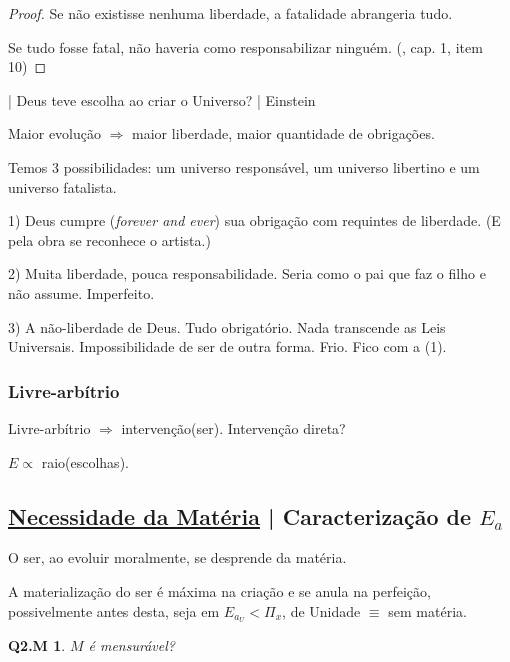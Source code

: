 \documentclass[12pt,a4paper]{article}
\begin{document}
			\begin{proof}
				Se n\~ao existisse nenhuma liberdade, a fatalidade abrangeria tudo.

				Se tudo fosse fatal, n\~ao haveria como responsabilizar ningu\'em.	(\cite{ceuinf}, cap. 1, item 10)
			\end{proof}

| Deus teve escolha ao criar o Universo? | Einstein

Maior evolu\c{c}\~ao $\Rightarrow$ maior liberdade, maior quantidade de obriga\c{c}\~oes.

Temos 3 possibilidades: um universo respons\'avel, um universo libertino e um universo fatalista.

1) Deus cumpre (\emph{forever and ever}) sua obriga\c{c}\~ao com requintes de liberdade. (E pela obra se reconhece o artista.)

2) Muita liberdade, pouca responsabilidade. Seria como o pai que faz o filho e n\~ao assume. Imperfeito.

3) A n\~ao-liberdade de Deus. Tudo obrigat\'orio. Nada transcende as Leis Universais. Impossibilidade de ser de outra forma.
Frio. Fico com a (1).

		\subsubsection{Livre-arb\'itrio}
			\begin{flushright}
			\end{flushright}

			Livre-arb\'itrio $\Rightarrow$ interven\c{c}\~ao(ser). Interven\c{c}\~ao direta?

			$E \propto$ raio(escolhas).

		\subsection{\underline{Necessidade da Mat\'eria} | Caracteriza\c{c}\~ao de $ E_a $}\label{materializacao}
			\begin{flushright}
			\end{flushright}

			O ser, ao evoluir moralmente, se desprende da mat\'eria.

			A materializa\c{c}\~ao do ser \'e m\'axima na cria\c{c}\~ao e se anula na perfei\c{c}\~ao, possivelmente antes desta, seja em $ E_{a_U} < \Pi_x $, de Unidade\cite{unidade} $\equiv$ sem mat\'eria.

			\newtheorem{Q2.M}{Q2.M}
			\begin{Q2.M} $M$ \'e mensur\'avel?
			\end{Q2.M}
\end{document}
